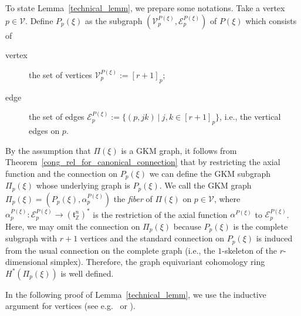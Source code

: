 \documentclass[12pt]{amsart}
\theoremstyle{definition}
\theoremstyle{remark}
\numberwithin{equation}{section}
\begin{document}
To state Lemma~\ref{technical_lemm}, we prepare some notations.
Take a vertex $p\in \mathcal{V}$.
Define $P_{p}(\xi)$ as the subgraph $(\mathcal{V}^{P(\xi)}_{p},\mathcal{E}^{P(\xi)}_{p})$ of $P(\xi)$ which consists of
\begin{description}
\item[vertex] the set of vertices $\mathcal{V}_{p}^{P(\xi)}:=[r+1]_{p}$;
\item[edge] the set of edges $\mathcal{E}_{p}^{P(\xi)}:=\{(p,jk)\ |\ j,k\in [r+1]_{p}\}$, i.e., the vertical edges on $p$.
\end{description}
By the assumption that $\Pi(\xi)$ is a GKM graph, it follows from
Theorem~\ref{cong_rel_for_canonical_connection} that by restricting the axial function and the connection on $P_{p}(\xi)$ we can define the GKM subgraph $\Pi_{p}(\xi)$ whose underlying graph is $P_{p}(\xi)$.
We call the GKM graph $\Pi_{p}(\xi)=(P_{p}(\xi),\alpha_{p}^{P(\xi)})$ the {\it fiber} of $\Pi(\xi)$ on $p\in \mathcal{V}$, where $\alpha_{p}^{P(\xi)}:\mathcal{E}_{p}^{P(\xi)}\to (\mathfrak{t}_{\mathbb{Z}}^{n})^{*}$ is the restriction of the axial function $\alpha^{P(\xi)}$ to $\mathcal{E}_{p}^{P(\xi)}$.
Here, we may omit the connection on $\Pi_{p}(\xi)$ because
$P_{p}(\xi)$ is the complete subgraph with $r+1$ vertices and the standard connection on $P_{p}(\xi)$ is induced from the usual connection on the complete graph (i.e., the $1$-skeleton of the $r$-dimensional simplex).
Therefore, the graph equivariant cohomology ring $H^{*}(\Pi_{p}(\xi))$ is well defined.

In the following proof of Lemma~\ref{technical_lemm}, we use the inductive argument for vertices  (see e.g.~\cite[Lemma 4.4]{MMP} or \cite[Lemma 5.6]{KU}).
\end{document}
